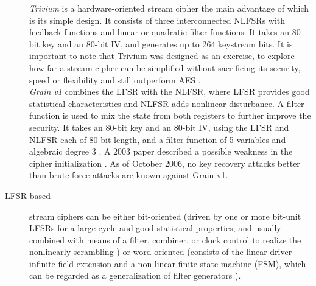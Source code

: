 \begin{description}
		\emph{Trivium} is a hardware-oriented stream cipher the main advantage of which is its simple design. It consists of three interconnected NLFSRs with feedback functions and linear or quadratic filter functions. It takes an 80-bit key and an 80-bit IV, and generates up to 264 keystream bits. It is important to note that Trivium was designed as an exercise, to explore how far a stream cipher can be simplified without sacrificing its security, speed or flexibility and still outperform AES \cite{canniere2008trivium}.\\
		\emph{Grain v1} combines the LFSR with the NLFSR, where LFSR provides good statistical characteristics and NLFSR adds nonlinear disturbance. A filter function is used to mix the state from both registers to further improve the security. It takes an 80-bit key and an 80-bit IV, using the LFSR and NLFSR each of 80-bit length, and a filter function of 5 variables and algebraic degree 3 \cite{hell2007grain}. A 2003 paper described a possible weakness in the cipher initialization \cite{kuccuk2006slide}. As of October 2006, no key recovery attacks better than brute force attacks are known against Grain v1.
		
		\item [LFSR-based] stream ciphers can be either bit-oriented (driven by one or more bit-unit LFSRs for a large cycle and good statistical properties, and usually combined with means of a filter, combiner, or clock control to realize the nonlinearly scrambling \cite{jiao2020stream}) or word-oriented (consists of the linear driver infinite field extension and a non-linear finite state machine (FSM), which can be regarded as a generalization of filter generators \cite{jiao2020stream}).
		
		\begin{figure}[h]
			

\end{figure}
\end{description}
